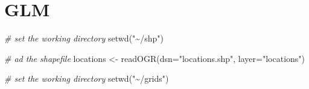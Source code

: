 \documentclass[
]{article}
\newenvironment{Shaded}{\begin{snugshade}}{\end{snugshade}}
\newcommand{\AttributeTok}[1]{\textcolor[rgb]{0.77,0.63,0.00}{#1}}
\newcommand{\CommentTok}[1]{\textcolor[rgb]{0.56,0.35,0.01}{\textit{#1}}}
\newcommand{\FunctionTok}[1]{\textcolor[rgb]{0.00,0.00,0.00}{#1}}
\newcommand{\NormalTok}[1]{#1}
\newcommand{\OtherTok}[1]{\textcolor[rgb]{0.56,0.35,0.01}{#1}}
\newcommand{\StringTok}[1]{\textcolor[rgb]{0.31,0.60,0.02}{#1}}
\begin{document}
\hypertarget{glm}{%
\section{GLM}\label{glm}}

\begin{Shaded}
\begin{Highlighting}[]
\CommentTok{\# set the working directory}
\FunctionTok{setwd}\NormalTok{(}\StringTok{"\textasciitilde{}/shp"}\NormalTok{)}

\CommentTok{\# ad the shapefile}
\NormalTok{locations }\OtherTok{\textless{}{-}} \FunctionTok{readOGR}\NormalTok{(}\AttributeTok{dsn=}\StringTok{"locations.shp"}\NormalTok{, }\AttributeTok{layer=}\StringTok{"locations"}\NormalTok{)}

\CommentTok{\# set the working directory}
\FunctionTok{setwd}\NormalTok{(}\StringTok{"\textasciitilde{}/grids"}\NormalTok{)}


\end{Highlighting}
\end{Shaded}
\end{document}
